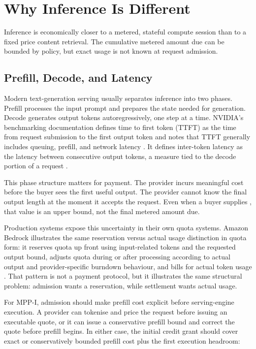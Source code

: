 \documentclass[11pt]{article}
\newcommand{\field}[1]{\texttt{\detokenize{#1}}}
\newcommand{\mppi}{MPP-I}
\begin{document}
\section{Why Inference Is Different}

Inference is economically closer to a metered, stateful compute session than to a fixed price content retrieval. The cumulative metered amount due can be bounded by policy, but exact usage is not known at request admission.

\subsection{Prefill, Decode, and Latency}

Modern text-generation serving usually separates inference into two phases. Prefill processes the input prompt and prepares the state needed for generation. Decode generates output tokens autoregressively, one step at a time. NVIDIA's benchmarking documentation defines time to first token (TTFT) as the time from request submission to the first output token and notes that TTFT generally includes queuing, prefill, and network latency \cite{nvidiaMetrics}. It defines inter-token latency as the latency between consecutive output tokens, a measure tied to the decode portion of a request \cite{nvidiaMetrics}.

This phase structure matters for payment. The provider incurs meaningful cost before the buyer sees the first useful output. The provider cannot know the final output length at the moment it accepts the request. Even when a buyer supplies \field{max_tokens}, that value is an upper bound, not the final metered amount due.

Production systems expose this uncertainty in their own quota systems. Amazon Bedrock illustrates the same reservation versus actual usage distinction in quota form: it reserves quota up front using input-related tokens and the requested output bound, adjusts quota during or after processing according to actual output and provider-specific burndown behaviour, and bills for actual token usage \cite{bedrockQuota}. That pattern is not a payment protocol, but it illustrates the same structural problem: admission wants a reservation, while settlement wants actual usage.

For \mppi{}, admission should make prefill cost explicit before serving-engine execution. A provider can tokenise and price the request before issuing an executable quote, or it can issue a conservative prefill bound and correct the quote before prefill begins. In either case, the initial credit grant should cover exact or conservatively bounded prefill cost plus the first execution headroom:
\end{document}
